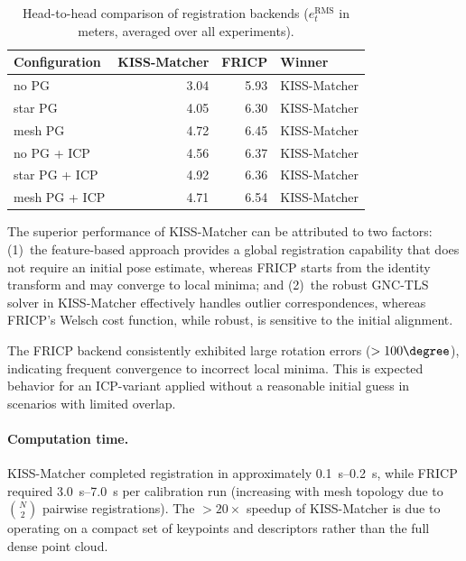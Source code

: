 \begin{table}[htbp]
    \centering
    \caption{Head-to-head comparison of registration backends
             ($e_t^\mathrm{RMS}$ in meters, averaged over all experiments).}
    \label{tab:head_to_head}
    \begin{tabular}{l r r l}
        \toprule
        \textbf{Configuration}
            & \textbf{KISS-Matcher}
            & \textbf{FRICP}
            & \textbf{Winner} \\
        \midrule
        no PG           & 3.04  & 5.93  & KISS-Matcher \\
        star PG         & 4.05  & 6.30  & KISS-Matcher \\
        mesh PG         & 4.72  & 6.45  & KISS-Matcher \\
        no PG + ICP     & 4.56  & 6.37  & KISS-Matcher \\
        star PG + ICP   & 4.92  & 6.36  & KISS-Matcher \\
        mesh PG + ICP   & 4.71  & 6.54  & KISS-Matcher \\
        \bottomrule
    \end{tabular}
\end{table}

The superior performance of KISS-Matcher can be attributed to two
factors:
(1)~the feature-based approach provides a global registration
capability that does not require an initial pose estimate, whereas
FRICP starts from the identity transform and may converge to local
minima; and
(2)~the robust GNC-TLS solver in KISS-Matcher effectively handles
outlier correspondences, whereas FRICP's Welsch cost function, while
robust, is sensitive to the initial alignment.

The FRICP backend consistently exhibited large rotation errors
($> 100\degree$), indicating frequent convergence to incorrect local
minima.
This is expected behavior for an ICP-variant applied without a
reasonable initial guess in scenarios with limited overlap.

\paragraph{Computation time.}
KISS-Matcher completed registration in approximately
\SIrange{0.1}{0.2}{\second}, while FRICP required
\SIrange{3.0}{7.0}{\second} per calibration run (increasing with
mesh topology due to $\binom{N}{2}$ pairwise registrations).
The $> 20\times$ speedup of KISS-Matcher is due to operating
on a compact set of keypoints and descriptors rather than the full
dense point cloud.

